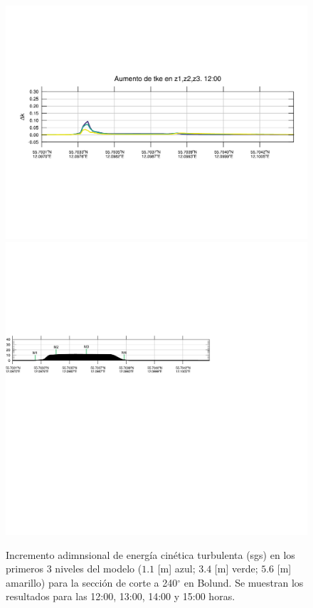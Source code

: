 \begin{figure}[H]
	\includegraphics[width=0.90\linewidth,trim={12mm 84mm 10mm 74mm},page=37,clip]{Imagenes/06/bol/delta_tke}\\%
	\includegraphics[width=0.90\linewidth,trim={-13.3mm 193mm 115mm 112mm},clip]{Imagenes/06/bol/cross_height}\\%
	\caption{Incremento adimnsional de energía cinética turbulenta (sgs) en los primeros 3 niveles del modelo ($1.1$ [m] azul; $3.4$ [m] verde; $5.6$ [m] amarillo) para la sección de corte a 240$^\circ$ en Bolund. Se muestran los resultados para las 12:00, 13:00, 14:00 y 15:00 horas.}
	\label{fig:06_bol_tke}
\end{figure}

